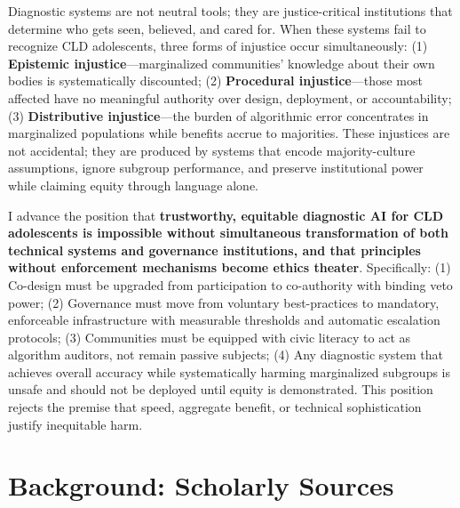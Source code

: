 \documentclass[12pt,a4paper]{article}
\begin{document}
Diagnostic systems are not neutral tools; they are justice-critical institutions that determine who gets seen, believed, and cared for. When these systems fail to recognize CLD adolescents, three forms of injustice occur simultaneously: (1) \textbf{Epistemic injustice}—marginalized communities' knowledge about their own bodies is systematically discounted; (2) \textbf{Procedural injustice}—those most affected have no meaningful authority over design, deployment, or accountability; (3) \textbf{Distributive injustice}—the burden of algorithmic error concentrates in marginalized populations while benefits accrue to majorities. These injustices are not accidental; they are produced by systems that encode majority-culture assumptions, ignore subgroup performance, and preserve institutional power while claiming equity through language alone.

\begin{tcolorbox}[colback=questionbg,colframe=questionborder,title=\textbf{GUIDING QUESTION:} What's the main ethical position you will advance?]
\end{tcolorbox}

I advance the position that \textbf{trustworthy, equitable diagnostic AI for CLD adolescents is impossible without simultaneous transformation of both technical systems and governance institutions, and that principles without enforcement mechanisms become ethics theater}. Specifically: (1) Co-design must be upgraded from participation to co-authority with binding veto power; (2) Governance must move from voluntary best-practices to mandatory, enforceable infrastructure with measurable thresholds and automatic escalation protocols; (3) Communities must be equipped with civic literacy to act as algorithm auditors, not remain passive subjects; (4) Any diagnostic system that achieves overall accuracy while systematically harming marginalized subgroups is unsafe and should not be deployed until equity is demonstrated. This position rejects the premise that speed, aggregate benefit, or technical sophistication justify inequitable harm.

\section{Background: Scholarly Sources}

\begin{tcolorbox}[colback=questionbg,colframe=questionborder,title=\textbf{GUIDING QUESTION:} What do the scholarly sources in your research portfolio say about this issue?]
\end{tcolorbox}
\end{document}
